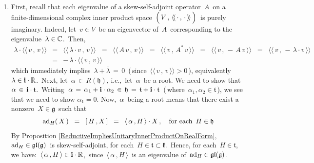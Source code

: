 \begin{enumerate}
\item
    First, recall that each eigenvalue of a skew-self-adjoint operator \,$A$\,
    on a finite-dimensional complex inner product space
    \,$\left(\,\overset{{\color{white}.}}{V}\,,\,\langle\!\langle\,\cdot\,,\,\cdot\,\rangle\!\rangle\,\right)$\,
    is purely imaginary.
    Indeed, let \,$v \in V$\, be an eigenvector of \,$A$\,
    corresponding to the eigenvalue \,$\lambda \in \mathbb{C}$.\,
    Then,
    \begin{eqnarray*}
    \overline{\lambda}\cdot\langle\!\langle\,v\,,\,v\,\rangle\!\rangle
    & = &
        \langle\!\langle\,\lambda\cdot v\,,\,v\,\rangle\!\rangle
    \;\; = \;\;
        \langle\!\langle\,A\,v\,,\,v\,\rangle\!\rangle
    \;\; = \;\;
        \langle\!\langle\,v\,,\,A^{*}\,v\,\rangle\!\rangle
    \;\; = \;\;
        \langle\!\langle\,v\,,\,-\,A\,v\,\rangle\!\rangle
    \;\; = \;\;
        \langle\!\langle\,v\,,\,-\,\lambda \cdot v\,\rangle\!\rangle
    \\
    & = &
        -\,\lambda \cdot \langle\!\langle\,v\,,\,v\,\rangle\!\rangle
    \end{eqnarray*}
    which immediately implies
    \,$\lambda + \overline{\lambda} \,=\, 0$\,
    (\,since \,$\langle\!\langle\,v\,,\,v\,\rangle\!\rangle > 0$\,),
    equivalently
    \,$\lambda \in \mathbf{i}\cdot\mathbb{R}$.\,
    \vskip 0.1cm
    Next, let \,$\alpha \,\in\, R(\mathfrak{h})$, i.e.,\, let \,$\alpha$\, be a root.
    We need to show that \,$\alpha \,\in\, \mathbf{i}\cdot\mathfrak{t}$.\,
    Writing
    \,$
    \alpha
    \,=\,
        \alpha_{1} + \mathbf{i}\cdot\alpha_{2}
    \,\in\,
        \mathfrak{h}
    \,=\,
        \mathfrak{t} + \mathbf{i}\cdot\mathfrak{t}
    $\,
    (\,where \,$\alpha_{1}, \alpha_{2} \in \mathfrak{t}$\,),
    we see that we need to show $\alpha_{1} = 0$.
    \vskip 0.1cm
    Now, \,$\alpha$\, being a root means that
    there exist a nonzero \,$X \in \mathfrak{g}$\, such that
    \begin{equation*}
    \textnormal{ad}_{H}(\,X\,)
    \;\; = \;\;
        [\,H\,,X\,]
    \;\; = \;\;
        \langle\,\alpha\,,H\,\rangle \cdot X\,,
    \quad
    \textnormal{for each \,$H \in \mathfrak{h}$}
    \end{equation*}
    By Proposition \ref{ReductiveImpliesUnitaryInnerProductOnRealForm},
    \,$\textnormal{ad}_{H} \in \mathfrak{gl}(\mathfrak{g})$\, is skew-self-adjoint,
    for each \,$H \in \mathfrak{t} \subset \mathfrak{k}$.\,
    Hence, for each \,$H \in \mathfrak{t}$,\, we have:
    \,$\langle\,\alpha\,,H\,\rangle \in \mathbf{i}\cdot\mathbb{R}$,\,
    since \,$\langle\,\alpha\,,H\,\rangle$\, is an eigenvalue of \,$\textnormal{ad}_{H} \in \mathfrak{gl}(\mathfrak{g})$.\,

\end{enumerate}
